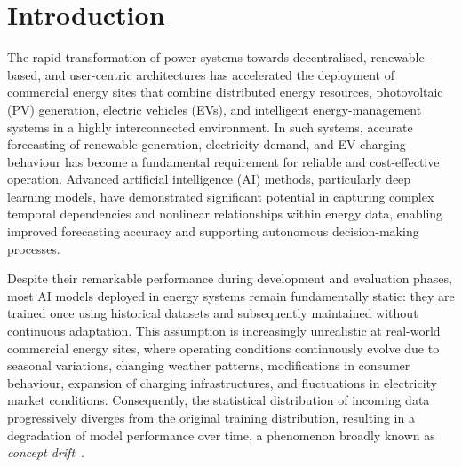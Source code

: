 \documentclass[journal]{IEEEtran}
\begin{document}
\section{Introduction}
\label{sec:intro}

The rapid transformation of power systems towards decentralised, renewable-based, and user-centric architectures has accelerated the deployment of commercial energy sites that combine distributed energy resources, photovoltaic (PV) generation, electric vehicles (EVs), and intelligent energy-management systems in a highly interconnected environment. In such systems, accurate forecasting of renewable generation, electricity demand, and EV charging behaviour has become a fundamental requirement for reliable and cost-effective operation. Advanced artificial intelligence (AI) methods, particularly deep learning models, have demonstrated significant potential in capturing complex temporal dependencies and nonlinear relationships within energy data, enabling improved forecasting accuracy and supporting autonomous decision-making processes.

Despite their remarkable performance during development and evaluation phases, most AI models deployed in energy systems remain fundamentally static: they are trained once using historical datasets and subsequently maintained without continuous adaptation. This assumption is increasingly unrealistic at real-world commercial energy sites, where operating conditions continuously evolve due to seasonal variations, changing weather patterns, modifications in consumer behaviour, expansion of charging infrastructures, and fluctuations in electricity market conditions. Consequently, the statistical distribution of incoming data progressively diverges from the original training distribution, resulting in a degradation of model performance over time, a phenomenon broadly known as \emph{concept drift}~\cite{gama2014survey}.
\end{document}
